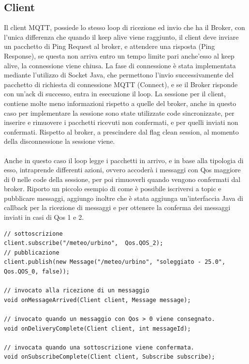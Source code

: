 \documentclass{article}
\begin{document}
\subsection{Client}
Il client MQTT, possiede lo stesso loop di ricezione ed invio che ha il Broker, con l'unica differenza che quando il keep alive viene raggiunto, il client deve inviare un pacchetto di Ping Request al broker, e attendere una risposta (Ping Response), se questa non arriva entro un tempo limite pari anche'esso al keep alive, la connessione viene chiusa. La fase di connessione è stata implementata mediante l'utilizzo di Socket Java, che permettono l'invio successivamente del pacchetto di richiesta di connessione MQTT (Connect), e se il Broker risponde con un'ack di successo, entra in esecuzione il loop. La sessione per il client, contiene molte meno informazioni rispetto a quelle del broker, anche in questo caso per implementare la sessione sono state utilizzate code sincronizzate, per inserire e rimuovere i pacchetti ricevuti non confermati, e per quelli inviati non confermati. Rispetto al broker, a prescindere dal flag clean session, al momento della disconnessione la sessione viene.\\\\ Anche in questo caso il loop legge i pacchetti in arrivo, e in base alla tipologia di esso, intraprende differenti azioni, ovvero accoderà i messaggi con Qos maggiore di 0 nelle code della sessione, per poi rimuoverli quando vengono confermati dal broker. Riporto un piccolo esempio di come è possibile iscriversi a topic e pubblicare messaggi, aggiungo inoltre che è stata aggiunga un'interfaccia Java di callback per la ricezione di messaggi e per ottenere la conferma dei messaggi inviati in casi di Qos 1 e 2.
\begin{lstlisting}[style=JavaStyle]
// sottoscrizione
client.subscribe("/meteo/urbino",  Qos.QOS_2);
// pubblicazione
client.publish(new Message("/meteo/urbino", "soleggiato - 25.0", Qos.QOS_0, false));

// invocato alla ricezione di un messaggio
void onMessageArrived(Client client, Message message);

// invocato quando un messaggio con Qos > 0 viene consegnato.
void onDeliveryComplete(Client client, int messageId);

// invocata quando una sottoscrizione viene confermata.
void onSubscribeComplete(Client client, Subscribe subscribe);

\end{lstlisting}
\end{document}
